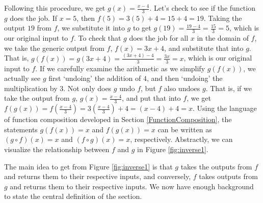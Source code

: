 Following this procedure,   we get $g(x) = \frac{x-4}{3}$.  Let's check to see if the function $g$ does the job.  If $x=5$, then $f(5) = 3(5)+4 = 15+4 = 19$.  Taking the output $19$ from $f$, we substitute it into $g$ to get $g(19) = \frac{19-4}{3} = \frac{15}{3} = 5$, which is our original input to $f$. To check that $g$ does the job for all $x$ in the domain of $f$, we take the generic output from $f$, $f(x) = 3x+4$, and substitute that into $g$.  That is, $g(f(x)) = g(3x+4) = \frac{(3x+4)-4}{3} = \frac{3x}{3} = x$, which is our original input to $f$.  If we carefully examine the arithmetic as we simplify $g(f(x))$, we actually see $g$ first `undoing' the addition of $4$, and then `undoing' the multiplication by $3$.  Not only does $g$ undo $f$, but $f$ also undoes $g$.  That is, if we take the output from $g$, $g(x) = \frac{x-4}{3}$, and put that into $f$, we get $f(g(x)) = f\left(\frac{x-4}{3}\right) = 3 \left(\frac{x-4}{3}\right) + 4 = (x-4) + 4 = x$.  Using the language of function composition developed in Section \ref{FunctionComposition}, the statements $g(f(x)) = x$ and $f(g(x)) = x$ can be written as $(g \circ f)(x) = x$ and $(f \circ g)(x) = x$, respectively.   Abstractly, we can visualize the relationship between $f$ and $g$ in Figure \ref{fig:inverse1}.



The main idea to get from Figure \ref{fig:inverse1} is that $g$ takes the outputs from $f$ and returns them to their respective inputs, and conversely, $f$ takes outputs from $g$ and returns them to their respective inputs.  We now have enough background to state the central definition of the section.

\smallskip


